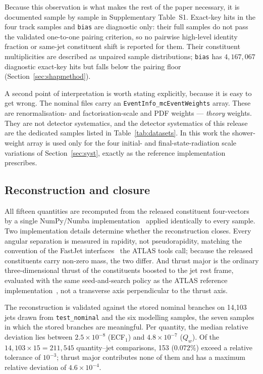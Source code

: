 \documentclass[pdflatex,sn-mathphys,Numbered,iicol]{sn-jnl}
\begin{document}
Because this observation is what makes the rest of the paper necessary, it is
documented sample by sample in Supplementary Table~S1. Exact-key hits in the
four track samples and \texttt{bias} are diagnostic only: their full samples do
not pass the validated one-to-one pairing criterion, so no pairwise high-level
identity fraction or same-jet constituent shift is reported for them. Their
constituent multiplicities are described as unpaired sample distributions;
\texttt{bias} has $4{,}167{,}067$ diagnostic exact-key hits but falls below the
pairing floor (Section~\ref{sec:shapmethod}).

A second point of interpretation is worth stating explicitly, because it is easy to get
wrong. The nominal files carry an \texttt{EventInfo\_mcEventWeights} array. These are
renormalisation- and factorisation-scale and PDF weights --- \emph{theory} weights.
They are not detector systematics, and the detector systematics of this release are the
dedicated samples listed in Table~\ref{tab:datasets}. In this work the shower-weight
array is used only for the four initial- and final-state-radiation scale variations of
Section~\ref{sec:syst}, exactly as the reference implementation prescribes.

\subsection{Reconstruction and closure}
\label{sec:closure}

All fifteen quantities are recomputed from the released constituent four-vectors by a
single NumPy/Numba implementation~\cite{Harris2020,Lam2015} applied identically to
every sample. Two implementation details determine whether the reconstruction closes.
Every angular separation is measured in rapidity, not pseudorapidity, matching the
convention of the FastJet interfaces~\cite{Cacciari2012fastjet} the ATLAS tools call;
because the released constituents carry non-zero mass, the two differ. And thrust
major is the ordinary three-dimensional thrust of the constituents boosted to the jet
rest frame, evaluated with the same seed-and-search policy as the ATLAS reference
implementation~\cite{ATLASGitLab}, not a transverse axis perpendicular to the thrust
axis.

The reconstruction is validated against the stored nominal branches on 14{,}103 jets
drawn from \texttt{test\_nominal} and the six modelling samples, the seven samples in
which the stored branches are meaningful. Per quantity, the median relative deviation
lies between $2.5\times10^{-8}$ (ECF$_1$) and $4.8\times10^{-7}$ ($Q_w$). Of the
$14{,}103 \times 15 = 211{,}545$ quantity--jet comparisons, 153 ($0.072\%$) exceed a
relative tolerance of $10^{-3}$; thrust major contributes none of them and has a
maximum relative deviation of $4.6\times10^{-4}$.
\end{document}
